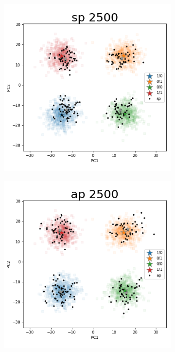 \documentclass{article}
\begin{document}
\begin{figure}
\begin{subfigure}{.5\textwidth}
  \centering
  \includegraphics[width=.98\linewidth]{img/ggsim2500_100000_200_2_1_100_1_sturef_ggsim2500_100000_2500_2_1_100_0_sp}
\end{subfigure}%
\begin{subfigure}{.5\textwidth}
  \centering
  \includegraphics[width=.98\linewidth]{img/ggsim2500_100000_200_2_1_100_1_sturef_ggsim2500_100000_2500_2_1_100_0_ap}

\end{subfigure}
\end{figure}
\end{document}
